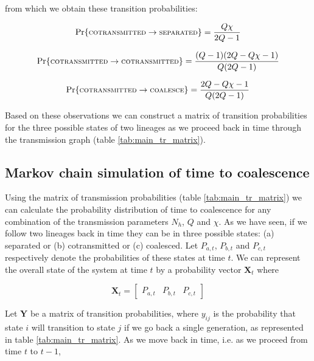 \documentclass[_main.tex]{subfiles}
\begin{document}
from which we obtain these transition probabilities:

\begin{equation*} \label{eq:supp_coal4}
\Pr \{ \textsc{\small{cotransmitted}} \rightarrow \textsc{\small{separated}} \} 
= \frac{Q\chi}{2Q-1}
\end{equation*}

\begin{equation*} \label{eq:supp_coal5}
\Pr \{ \textsc{\small{cotransmitted}} \rightarrow \textsc{\small{cotransmitted}} \} 
= \frac{(Q-1)(2Q - Q\chi - 1)}{Q(2Q-1)}
\end{equation*}

\begin{equation*} \label{eq:supp_coal6}
\Pr \{ \textsc{\small{cotransmitted}} \rightarrow \textsc{\small{coalesce}} \} 
= \frac{2Q - Q\chi - 1}{Q(2Q-1)}
\end{equation*}

Based on these observations we can construct a matrix of transition probabilities for the three possible states of two lineages as we proceed back in time through the transmission graph (table \ref{tab:main_tr_matrix}).

\subsection{Markov chain simulation of time to coalescence} 
\label{supp_mcs}

Using the matrix of transmission probabilities (table \ref{tab:main_tr_matrix}) we can calculate the probability distribution of time to coalescence for any combination of the transmission parameters $N_h$, $Q$ and $\chi$.  As we have seen, if we follow two lineages back in time they can be in three possible states: (a) separated or (b) cotransmitted or (c) coalesced.  Let $P_{a,t}$, $P_{b,t}$ and $P_{c,t}$ respectively denote the probabilities of these states at time $t$.  We can represent the overall state of the system at time $t$ by a probability vector $\textbf{X}_t$ where

\begin{equation*} 
\textbf{X}_t =
\begin{bmatrix}
P_{a,t} & P_{b,t} & P_{c,t}
\end{bmatrix}
\end{equation*}

Let $\textbf{Y}$ be a matrix of transition probabilities, where $y_{ij}$ is the probability that state $i$ will transition to state $j$ if we go back a single generation, as represented in table \ref{tab:main_tr_matrix}.  As we move back in time, i.e. as we proceed from time $t$ to $t-1$,
\end{document}
